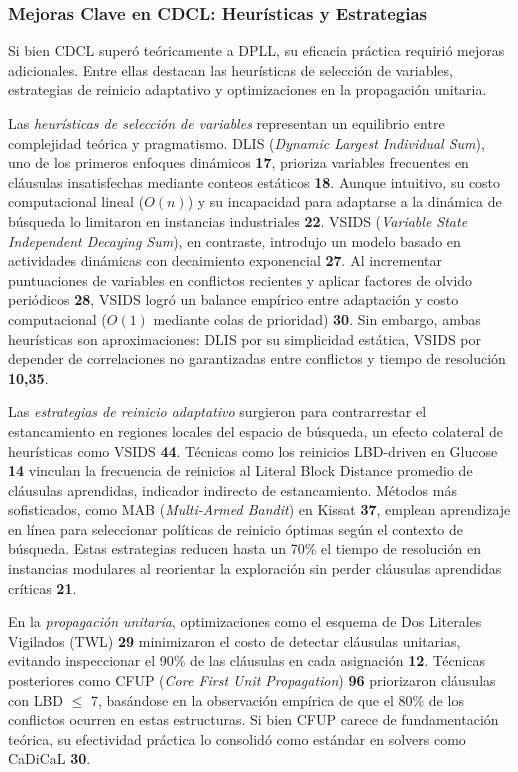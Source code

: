 \subsubsection{Mejoras Clave en CDCL: Heurísticas y Estrategias}
\label{subsubsec:mejoras-cdcl}

Si bien CDCL superó teóricamente a DPLL, su eficacia práctica requirió mejoras adicionales. Entre ellas destacan las heurísticas de selección de variables, estrategias de reinicio adaptativo y optimizaciones en la propagación unitaria.

Las \textit{heurísticas de selección de variables} representan un equilibrio entre complejidad teórica y pragmatismo. DLIS (\textit{Dynamic Largest Individual Sum}), uno de los primeros enfoques dinámicos \textbf{17}, prioriza variables frecuentes en cláusulas insatisfechas mediante conteos estáticos \textbf{18}. Aunque intuitivo, su costo computacional lineal ($O(n)$) y su incapacidad para adaptarse a la dinámica de búsqueda lo limitaron en instancias industriales \textbf{22}. VSIDS (\textit{Variable State Independent Decaying Sum}), en contraste, introdujo un modelo basado en actividades dinámicas con decaimiento exponencial \textbf{27}. Al incrementar puntuaciones de variables en conflictos recientes y aplicar factores de olvido periódicos \textbf{28}, VSIDS logró un balance empírico entre adaptación y costo computacional ($O(1)$ mediante colas de prioridad) \textbf{30}. Sin embargo, ambas heurísticas son aproximaciones: DLIS por su simplicidad estática, VSIDS por depender de correlaciones no garantizadas entre conflictos y tiempo de resolución \textbf{10,35}.

Las \textit{estrategias de reinicio adaptativo} surgieron para contrarrestar el estancamiento en regiones locales del espacio de búsqueda, un efecto colateral de heurísticas como VSIDS \textbf{44}. Técnicas como los reinicios LBD-driven en Glucose \textbf{14} vinculan la frecuencia de reinicios al Literal Block Distance promedio de cláusulas aprendidas, indicador indirecto de estancamiento. Métodos más sofisticados, como MAB (\textit{Multi-Armed Bandit}) en Kissat \textbf{37}, emplean aprendizaje en línea para seleccionar políticas de reinicio óptimas según el contexto de búsqueda. Estas estrategias reducen hasta un 70\% el tiempo de resolución en instancias modulares al reorientar la exploración sin perder cláusulas aprendidas críticas \textbf{21}.

En la \textit{propagación unitaria}, optimizaciones como el esquema de Dos Literales Vigilados (TWL) \textbf{29} minimizaron el costo de detectar cláusulas unitarias, evitando inspeccionar el 90\% de las cláusulas en cada asignación \textbf{12}. Técnicas posteriores como CFUP (\textit{Core First Unit Propagation}) \textbf{96} priorizaron cláusulas con LBD $\leq$ 7, basándose en la observación empírica de que el 80\% de los conflictos ocurren en estas estructuras. Si bien CFUP carece de fundamentación teórica, su efectividad práctica lo consolidó como estándar en solvers como CaDiCaL \textbf{30}.

